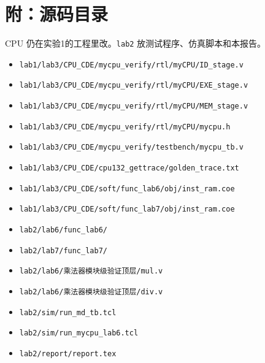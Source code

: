 \documentclass{article}
\begin{document}
\section{附：源码目录}
CPU 仍在实验1的工程里改。\texttt{lab2} 放测试程序、仿真脚本和本报告。
\begin{itemize}
\item \verb|lab1/lab3/CPU_CDE/mycpu_verify/rtl/myCPU/ID_stage.v|
\item \verb|lab1/lab3/CPU_CDE/mycpu_verify/rtl/myCPU/EXE_stage.v|
\item \verb|lab1/lab3/CPU_CDE/mycpu_verify/rtl/myCPU/MEM_stage.v|
\item \verb|lab1/lab3/CPU_CDE/mycpu_verify/rtl/myCPU/mycpu.h|
\item \verb|lab1/lab3/CPU_CDE/mycpu_verify/testbench/mycpu_tb.v|
\item \verb|lab1/lab3/CPU_CDE/cpu132_gettrace/golden_trace.txt|
\item \verb|lab1/lab3/CPU_CDE/soft/func_lab6/obj/inst_ram.coe|
\item \verb|lab1/lab3/CPU_CDE/soft/func_lab7/obj/inst_ram.coe|
\item \verb|lab2/lab6/func_lab6/|
\item \verb|lab2/lab7/func_lab7/|
\item \verb|lab2/lab6/乘法器模块级验证顶层/mul.v|
\item \verb|lab2/lab6/乘法器模块级验证顶层/div.v|
\item \verb|lab2/sim/run_md_tb.tcl|
\item \verb|lab2/sim/run_mycpu_lab6.tcl|
\item \verb|lab2/report/report.tex|
\end{itemize}
\end{document}
